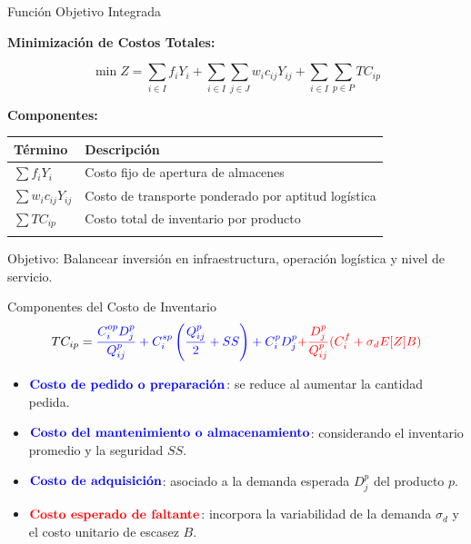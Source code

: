 \documentclass[
  ignorenonframetext,
]{beamer}
\providecommand{\tightlist}{%
  \setlength{\itemsep}{0pt}\setlength{\parskip}{0pt}}
\begin{document}
\begin{frame}{Función Objetivo Integrada}
\label{funciuxf3n-objetivo-integrada}
\justifying

\textbf{Minimización de Costos Totales:}

\[
\min Z = \sum_{i \in I} f_i Y_i + \sum_{i \in I} \sum_{j \in J} w_i c_{ij} Y_{ij} + \sum_{i \in I} \sum_{p \in P} TC_{ip}
\]

\textbf{Componentes:}

\begin{longtable}[]{@{}
  >{\raggedright\arraybackslash}p{}
  >{\raggedright\arraybackslash}p{}@{}}
\toprule\noalign{}
\begin{minipage}[b]{\linewidth}\raggedright
Término
\end{minipage} & \begin{minipage}[b]{\linewidth}\raggedright
Descripción
\end{minipage} \\
\midrule\noalign{}
\endhead
\(\sum f_i Y_i\) & Costo fijo de apertura de almacenes \\
\(\sum w_i c_{ij} Y_{ij}\) & Costo de transporte ponderado por aptitud
logística \\
\(\sum TC_{ip}\) & Costo total de inventario por producto \\
\bottomrule\noalign{}
\end{longtable}

\vspace{0.3cm}

\alert{Objetivo:} Balancear inversión en infraestructura, operación
logística y nivel de servicio.
\end{frame}

\begin{frame}{Componentes del Costo de Inventario}
\label{componentes-del-costo-de-inventario}
\[
TC_{ip} =
{\color{blue}\frac{C^{op}_i D^p_j}{Q^p_{ij}} +
C^{sp}_i \left(\frac{Q^p_{ij}}{2} + SS\right) +
C^p_i D^p_j} {\color{red}+
\frac{D^p_j}{Q^p_{ij}} (C^f_i + \sigma_d E[Z] B)}
\]

\begin{itemize}
\tightlist
\item
  \({\textcolor{blue}{\textbf{Costo de pedido o preparación}}}\): se
  reduce al aumentar la cantidad pedida.\\
\item
  \({\textcolor{blue}{\textbf{Costo del mantenimiento o almacenamiento}}}\):
  considerando el inventario promedio y la seguridad \(SS\).\\
\item
  \({\textcolor{blue}{\textbf{Costo de adquisición}}}\): asociado a la
  demanda esperada \(D^p_j\) del producto \(p\).\\
\item
  \({\textcolor{red}{\textbf{Costo esperado de faltante}}}\): incorpora
  la variabilidad de la demanda \(\sigma_d\) y el costo unitario de
  escasez \(B\).
\end{itemize}
\end{frame}
\end{document}
